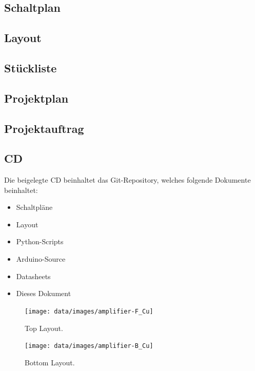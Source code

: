 \documentclass{fhnwreport} %
\begin{document}
\clearpage
\begin{appendices}

\subsection{Schaltplan}
\subsection{Layout}
\subsection{Stückliste}
\subsection{Projektplan}
\subsection{Projektauftrag}
\subsection{CD}

Die beigelegte CD beinhaltet das Git-Repository, welches folgende Dokumente beinhaltet:
  \begin{itemize}
    \item Schaltpläne\\
    \item Layout\\
    \item Python-Scripts\\
    \item Arduino-Source\\
    \item Datasheets\\
    \item Dieses Dokument
  \end{itemize}


\begin{figure}[H]
\begin{center}
  \texttt{[image: data/images/amplifier-F\_Cu]}
  \caption{Top Layout.}
  \label{fig:top}
\end{center}
\end{figure}

\begin{figure}[H]
\begin{center}
  \texttt{[image: data/images/amplifier-B\_Cu]}
  \caption{Bottom Layout.}
  \label{fig:bot}
\end{center}
\end{figure}







\end{appendices}

\clearpage


\clearpage
\listoffigures
\end{document}
